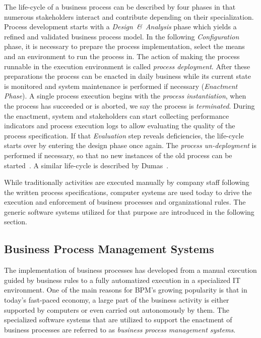 \noindent
The life-cycle of a business process can be described by four phases in that numerous stakeholders interact and contribute depending on their specialization.
Process development starts with a \emph{Design~\&~Analysis} phase which yields a refined and validated business process model.
In the following \emph{Configuration} phase, it is necessary to prepare the process implementation, select the means and an environment to run the process in.
The action of making the process runnable in the execution environment is called \emph{process deployment}.
After these preparations the process can be enacted in daily business while its current state is monitored and system maintenance is performed if necessary (\emph{Enactment Phase}). 
A single process execution begins with the \emph{process instantiation}, when the process has succeeded or is aborted, we say the process is \emph{terminated}.
During the enactment, system and stakeholders can start collecting performance indicators and process execution logs to allow evaluating the quality of the process specification. If that \emph{Evaluation} step reveals deficiencies, the life-cycle starts over by entering the design phase once again.
The \emph{process un-deployment} is performed if necessary, so that no new instances of the old process can be started~\cite[p.~11~ff.]{weske:bpm-book}. A similar life-cycle is described by Dumas~\cite{dumas:bpm}.

While traditionally activities are executed manually by company staff following the written process specifications, computer systems are used today to drive the execution and enforcement of business processes and organizational rules.
The generic software systems utilized for that purpose are introduced in the following section.

\subsection{Business Process Management Systems}\label{ch:bg:bpms}
The implementation of business processes has developed from a manual execution guided by business rules to a fully automatized execution in a specialized IT environment.
One of the main reasons for \acs{BPM}'s growing popularity is that in today's fast-paced economy, a large part of the business activity is either supported by computers or even carried out autonomously by them.
The specialized software systems that are utilized to support the enactment of business processes are referred to as \emph{business process management systems}.


